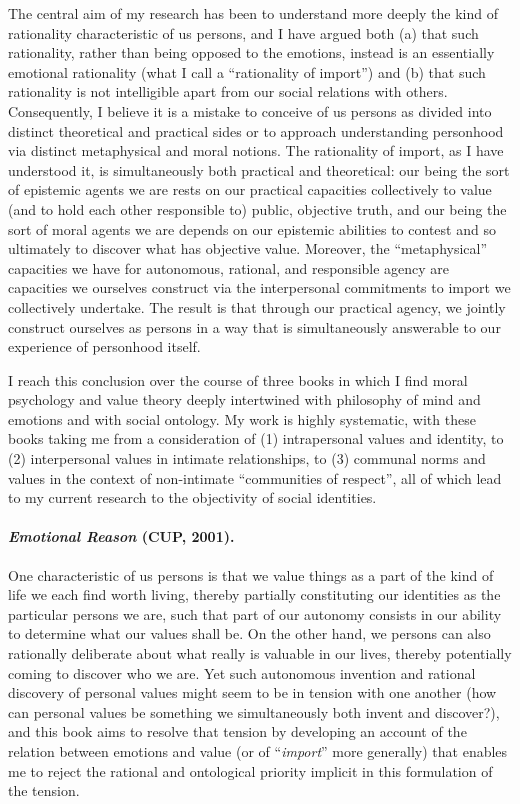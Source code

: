 \documentclass[%
  11pt,%
]{article}
\begin{document}
The central aim of my research has been to understand more deeply the kind of rationality characteristic of us persons, and I have argued both (a) that such rationality, rather than being opposed to the emotions, instead is an essentially emotional rationality (what I call a \enquote{rationality of import}) and (b) that such rationality is not intelligible apart from our social relations with others. Consequently, I believe it is a mistake to conceive of us persons as divided into distinct theoretical and practical sides or to approach understanding personhood via distinct metaphysical and moral notions. The rationality of import, as I have understood it, is simultaneously both practical and theoretical: our being the sort of epistemic agents we are rests on our practical capacities collectively to value (and to hold each other responsible to) public, objective truth, and our being the sort of moral agents we are depends on our epistemic abilities to contest and so ultimately to discover what has objective value. Moreover, the \enquote{metaphysical} capacities we have for autonomous, rational, and responsible agency are capacities we ourselves construct via the interpersonal commitments to import we collectively undertake. The result is that through our practical agency, we jointly construct ourselves as persons in a way that is simultaneously answerable to our experience of personhood itself.

I reach this conclusion over the course of three books in which I find moral psychology and value theory deeply intertwined with philosophy of mind and emotions and with social ontology. My work is highly systematic, with these books taking me from a consideration of (1) intrapersonal values and identity, to (2) interpersonal values in intimate relationships, to (3) communal norms and values in the context of non-intimate \enquote{communities of respect}, all of which lead to my current research to the objectivity of social identities.

\paragraph{\emph{Emotional Reason} (CUP, 2001).}

One characteristic of us persons is that we value things as a part of the kind of life we each find worth living, thereby partially constituting our identities as the particular persons we are, such that part of our autonomy consists in our ability to determine what our values shall be. On the other hand, we persons can also rationally deliberate about what really is valuable in our lives, thereby potentially coming to discover who we are. Yet such autonomous invention and rational discovery of personal values might seem to be in tension with one another (how can personal values be something we simultaneously both invent and discover?), and this book aims to resolve that tension by developing an account of the relation between emotions and value (or of \enquote{\emph{import}} more generally) that enables me to reject the rational and ontological priority implicit in this formulation of the tension.
\end{document}
